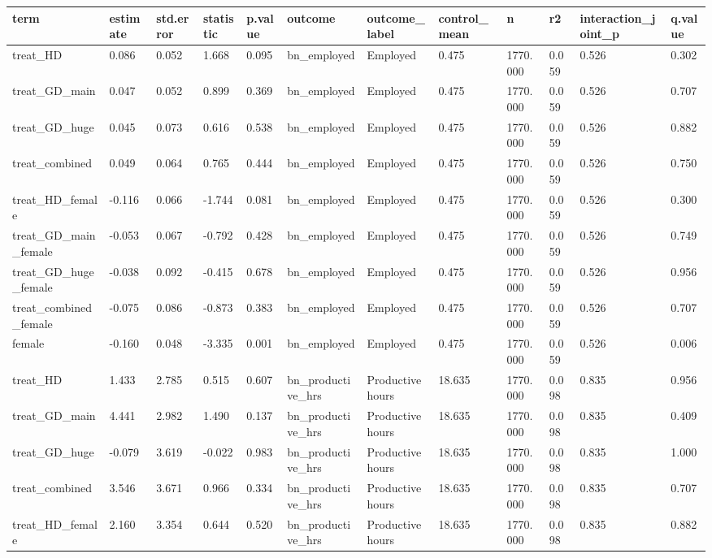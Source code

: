 \begin{tabular}{llllllllllll}
\toprule
term & estimate & std.error & statistic & p.value & outcome & outcome\_label & control\_mean & n & r2 & interaction\_joint\_p & q.value
 \\
\midrule
treat\_HD & 0.086 & 0.052 & 1.668 & 0.095 & bn\_employed & Employed & 0.475 & 1770.000 & 0.059 & 0.526 & 0.302 \\
treat\_GD\_main & 0.047 & 0.052 & 0.899 & 0.369 & bn\_employed & Employed & 0.475 & 1770.000 & 0.059 & 0.526 & 0.707 \\
treat\_GD\_huge & 0.045 & 0.073 & 0.616 & 0.538 & bn\_employed & Employed & 0.475 & 1770.000 & 0.059 & 0.526 & 0.882 \\
treat\_combined & 0.049 & 0.064 & 0.765 & 0.444 & bn\_employed & Employed & 0.475 & 1770.000 & 0.059 & 0.526 & 0.750 \\
treat\_HD\_female & -0.116 & 0.066 & -1.744 & 0.081 & bn\_employed & Employed & 0.475 & 1770.000 & 0.059 & 0.526 & 0.300 \\
treat\_GD\_main\_female & -0.053 & 0.067 & -0.792 & 0.428 & bn\_employed & Employed & 0.475 & 1770.000 & 0.059 & 0.526 & 0.749 \\
treat\_GD\_huge\_female & -0.038 & 0.092 & -0.415 & 0.678 & bn\_employed & Employed & 0.475 & 1770.000 & 0.059 & 0.526 & 0.956 \\
treat\_combined\_female & -0.075 & 0.086 & -0.873 & 0.383 & bn\_employed & Employed & 0.475 & 1770.000 & 0.059 & 0.526 & 0.707 \\
female & -0.160 & 0.048 & -3.335 & 0.001 & bn\_employed & Employed & 0.475 & 1770.000 & 0.059 & 0.526 & 0.006 \\
treat\_HD & 1.433 & 2.785 & 0.515 & 0.607 & bn\_productive\_hrs & Productive hours & 18.635 & 1770.000 & 0.098 & 0.835 & 0.956 \\
treat\_GD\_main & 4.441 & 2.982 & 1.490 & 0.137 & bn\_productive\_hrs & Productive hours & 18.635 & 1770.000 & 0.098 & 0.835 & 0.409 \\
treat\_GD\_huge & -0.079 & 3.619 & -0.022 & 0.983 & bn\_productive\_hrs & Productive hours & 18.635 & 1770.000 & 0.098 & 0.835 & 1.000 \\
treat\_combined & 3.546 & 3.671 & 0.966 & 0.334 & bn\_productive\_hrs & Productive hours & 18.635 & 1770.000 & 0.098 & 0.835 & 0.707 \\
treat\_HD\_female & 2.160 & 3.354 & 0.644 & 0.520 & bn\_productive\_hrs & Productive hours & 18.635 & 1770.000 & 0.098 & 0.835 & 0.882 \\

\end{tabular}
